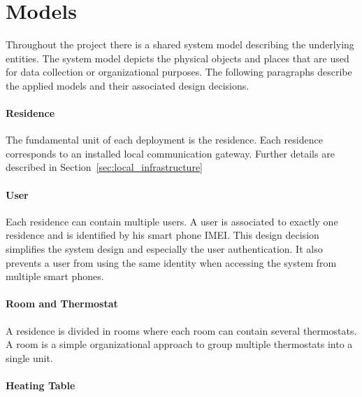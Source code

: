\section{Models}
\label{sec:system_overview_models}

Throughout the project there is a shared system model describing the underlying entities. The system model depicts the physical objects and places that are used for data collection or organizational purposes. The following paragraphs describe the applied models and their associated design decisions.


\paragraph{Residence}

The fundamental unit of each deployment is the residence. Each residence corresponds to an installed local communication gateway. Further details are described in Section~\ref{sec:local_infrastructure}

\paragraph{User}

Each residence can contain multiple users. A user is associated to exactly one residence and is identified by his smart phone IMEI. This design decision simplifies the system design and especially the user authentication. It also prevents a user from using the same identity when accessing the system from multiple smart phones.

\paragraph{Room and Thermostat}
A residence is divided in rooms where each room can contain several thermostats. A room is a simple organizational approach to group multiple thermostats into a single unit.

\paragraph{Heating Table}

